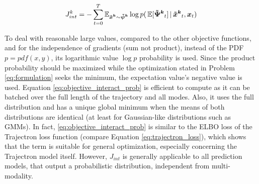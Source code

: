 \begin{equation}
J_{int}^k = - \sum_{t=0}^T \mathbb{E}_{\xped[k] \sim \dist[k]} \log p(\, \mathbb{E}[\distwo[k]_t] \, | \, \xped[k]_t, \x_t)
\label{eq:objective_interact_prob}
\end{equation}

To deal with reasonable large values, compared to the other objective functions, and for the independence of gradients (sum not product), instead of the \ac{PDF} $p = pdf(x, y)$, its logarithmic value $\log p$ probability is used. Since the product probability should be maximized while the optimization stated in Problem \ref{eq:formulation} seeks the minimum, the expectation value's negative value is used.
\newline
Equation \ref{eq:objective_interact_prob} is efficient to compute as it can be batched over the full length of the trajectory and all modes. Also, it uses the full distribution and has a unique global minimum when the means of both distributions are identical (at least for Gaussian-like distributions such as \ac{GMM}s). In fact, \ref{eq:objective_interact_prob} is similar to the \ac{ELBO} loss of the Trajectron loss function (compare Equation \ref{eq:trajectron_loss}), which shows that the term is suitable for general optimization, especially concerning the Trajectron model itself. However, $J_{int}$ is generally applicable to all prediction models, that output a probabilistic distribution, independent from multi-modality.
